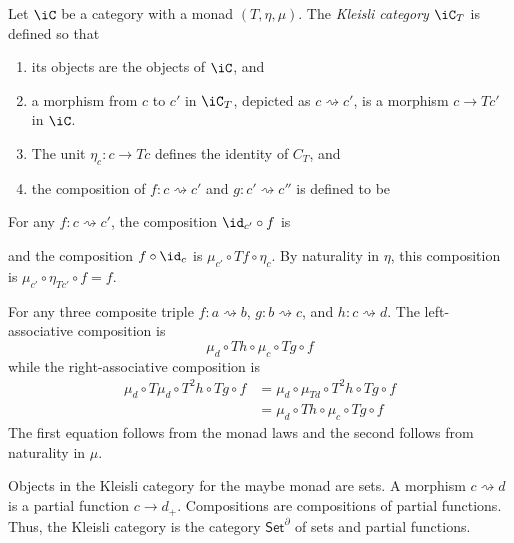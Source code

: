 \documentclass{amsart}
\begin{document}
\begin{defn}
  Let $\iC$ be a category with a monad $(T, \eta, \mu)$.
  The \emph{Kleisli category} $\iC_{T}$ is defined so that
  \begin{enumerate}
  \item its objects are the objects of $\iC$, and
  \item a morphism from $c$ to $c'$ in $\iC_{T}$, depicted as $c \rightsquigarrow c'$, is a morphism $c \to Tc'$ in $\iC$.
  \item The unit $\eta_{c} : c \to Tc$ defines the identity of $C_{T}$, and
  \item the composition of $f : c \rightsquigarrow c'$ and $g : c' \rightsquigarrow c''$ is defined to be
    
  \end{enumerate}
\end{defn}
For any $f : c \rightsquigarrow c'$, the composition $\id_{c'} \circ f$ is

and the composition $f \circ \id_{c}$ is $\mu_{c'} \circ Tf \circ \eta_{c}$.
By naturality in $\eta$, this composition is $\mu_{c'} \circ \eta_{Tc'} \circ f = f$.

For any three composite triple $f : a \rightsquigarrow b$, $g : b \rightsquigarrow c$, and $h : c \rightsquigarrow d$.
The left-associative composition is
\[
  \mu_{d} \circ Th \circ \mu_{c} \circ Tg \circ f
\]
while the right-associative composition is
\begin{align}
  \mu_{d} \circ T\mu_{d} \circ T^{2}h \circ Tg \circ f &= \mu_{d} \circ \mu_{Td} \circ T^{2}h \circ Tg \circ f\\
                                   &= \mu_{d} \circ Th \circ \mu_{c} \circ Tg \circ f
\end{align}
The first equation follows from the monad laws and the second follows from naturality in $\mu$.

\begin{eg}
  Objects in the Kleisli category for the maybe monad are sets.
  A morphism $c \rightsquigarrow d$ is a partial function $c \to d_{+}$.
  Compositions are compositions of partial functions.
  Thus, the Kleisli category is the category $\mathsf{Set}^{\partial}$ of sets and partial functions.
\end{eg}
\end{document}
